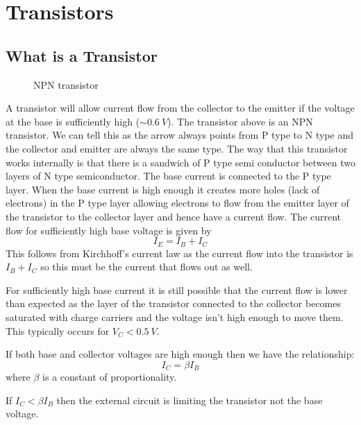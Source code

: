 \documentclass{article}
\begin{document}
    \section{Transistors}
    \subsection{What is a Transistor}
    \begin{figure}[ht]
        \centering
        \caption{NPN transistor}
    \end{figure}
    A transistor will allow current flow from the collector to the emitter if the voltage at the base is sufficiently high (\(\sim \SI{0.6}{V}\)). The transistor above is an NPN transistor. We can tell this as the arrow always points from P type to N type and the collector and emitter are always the same type. The way that this transistor works internally is that there is a sandwich of P type semi conductor between two layers of N type semiconductor. The base current is connected to the P type layer. When the base current is high enough it creates more holes (lack of electrons) in the P type layer allowing electrons to flow from the emitter layer of the transistor to the collector layer and hence have a current flow. The current flow for sufficiently high base voltage is given by
    \[I_E=I_B+I_C\]
    This follows from Kirchhoff's current law as the current flow into the transistor is \(I_B+I_C\) so this must be the current that flows out as well.
    
    For sufficiently high base current it is still possible that the current flow is lower than expected as the layer of the transistor connected to the collector becomes saturated with charge carriers and the voltage isn't high enough to move them. This typically occurs for \(V_C<\SI{0.5}{V}\).
    
    If both base and collector voltages are high enough then we have the relationship:
    \begin{equation}\label{eqn:IC=betaIB}
        I_C=\beta I_B
    \end{equation}
    where \(\beta\) is a constant of proportionality.
    
    If \(I_C<\beta I_B\) then the external circuit is limiting the transistor not the base voltage.
    
\end{document}
